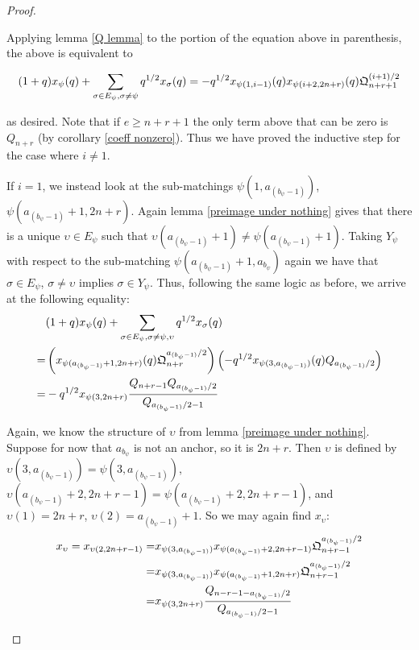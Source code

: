 \documentclass{amsart}
\begin{document}
\begin{proof}
\begin{enumerate}[label={case \arabic*:}]
		Applying lemma \ref{Q lemma} to the portion of the equation above in parenthesis, the above is equivalent to
		
		$$(1+q)x_\psi(q)+\sum_{\sigma\in E_\psi,\sigma\not=\psi}q^{1/2}x_\sigma(q)=-q^{1/2}x_{\psi(1,i-1)}(q)x_{\psi(i+2,2n+r)}(q)\mathfrak{Q}_{n+r+1}^{(i+1)/2}$$
		
		as desired. Note that if $e\geq n+r+1$ the only term above that can be zero is $Q_{n+r}$ (by corollary \ref{coeff nonzero}). Thus we have proved the inductive step for the case where $i\not=1$.
		
		\vspace{5mm}
		If $i=1$, we instead look at the sub-matchings $\psi(1,a_{(b_\psi-1)})$, $\psi(a_{(b_\psi-1)}+1,2n+r)$. Again lemma \ref{preimage under nothing} gives that there is a unique $\upsilon\in E_\psi$ such that $\upsilon(a_{(b_\psi-1)}+1)\not=\psi(a_{(b_\psi-1)}+1)$. Taking $Y_\psi$ with respect to the sub-matching $\psi(a_{(b_\psi-1)}+1,a_{b_\psi})$ again we have that $\sigma\in E_\psi$, $\sigma\not=\upsilon$ implies $\sigma\in Y_\psi$. Thus, following the same logic as before, we arrive at the following equality:
		\begin{align*}
		&(1+q)x_\psi(q)+\sum_{\sigma\in E_\psi,\sigma\not=\psi,\upsilon}q^{1/2}x_\sigma(q)\\
		=&\left( x_{\psi(a_{(b_\psi-1)}+1,2n+r)}(q)\mathfrak{Q}_{n+r}^{a_{(b_\psi-1)}/2} \right)\left( -q^{1/2}x_{\psi(3,a_{(b_\psi-1)})}(q)Q_{a_{(b_\psi-1)}/2} \right)\\
		=&-q^{1/2}x_{\psi(3,2n+r)}\frac{Q_{n+r-1}Q_{a_{(b_\psi-1)}/2}}{Q_{a_{(b_\psi-1)}/2-1}}
		\end{align*}
		
		Again, we know the structure of $\upsilon$ from lemma \ref{preimage under nothing}. Suppose for now that $a_{b_\psi}$ is not an anchor, so it is $2n+r$. Then $\upsilon$ is defined by $\upsilon(3,a_{(b_\psi-1)})=\psi(3,a_{(b_\psi-1)})$, $\upsilon(a_{(b_\psi-1)}+2,2n+r-1)=\psi(a_{(b_\psi-1)}+2,2n+r-1)$, and $\upsilon(1)=2n+r$, $\upsilon(2)=a_{(b_\psi-1)}+1$. So we may again find $x_\upsilon$:
		\begin{align*}
		x_\upsilon=x_{\upsilon(2,2n+r-1)}=&x_{\psi(3,a_{(b_\psi-1)})}x_{\psi(a_{(b_\psi-1)}+2,2n+r-1)}\mathfrak{Q}_{n+r-1}^{a_{(b_\psi-1)}/2}\\
		=&x_{\psi(3,a_{(b_\psi-1)})}x_{\psi(a_{(b_\psi-1)}+1,2n+r)}\mathfrak{Q}_{n+r-1}^{a_{(b_\psi-1)}/2}\\
		=&x_{\psi(3,2n+r)}\frac{Q_{n-r-1-a_{(b_\psi-1)}/2}}{Q_{a_{(b_\psi-1)}/2-1}}
		\end{align*}
		

\end{enumerate}
\end{proof}
\end{document}
